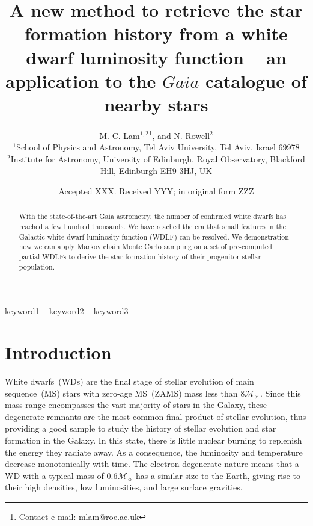 \documentclass[fleqn,usenatbib]{mnras}
\title[Galactic SFH from Gaia GCNS WDLF]{A new method to retrieve the star formation history from a white dwarf luminosity function -- an application to the $Gaia$ catalogue of nearby stars}
\author[M. C. Lam et al.]{
M. C. Lam$^{1, 2}$\thanks{Contact e-mail: \href{mailto:mlam@roe.ac.uk}{mlam@roe.ac.uk}},
and N. Rowell$^{2}$
\\
$^{1}$School of Physics and Astronomy, Tel Aviv University, Tel Aviv, Israel 69978\\
$^{2}$Institute for Astronomy, University of Edinburgh, Royal Observatory, Blackford Hill, Edinburgh EH9 3HJ, UK
}
\date{Accepted XXX. Received YYY; in original form ZZZ}
\newcommand{\msun}{\mathcal{M}_{\sun}}
\begin{document}
\label{firstpage}
\pagerange{\pageref{firstpage}--\pageref{lastpage}}
\maketitle


\begin{abstract}
With the state-of-the-art Gaia astrometry, the number of confirmed white dwarfs
has reached a few hundred thousands. We have reached the era that small features
in the Galactic white dwarf luminosity function (WDLF) can be resolved. We
demonstration how we can apply Markov chain Monte Carlo sampling on a set of
pre-computed partial-WDLFs to derive the star formation history of their progenitor
stellar population.

\end{abstract}

\begin{keywords}
keyword1 -- keyword2 -- keyword3
\end{keywords}



\section{Introduction}
White dwarfs~(WDs) are the final stage of stellar evolution of main
sequence~(MS) stars with zero-age MS~(ZAMS) mass less than $8\msun$. Since this
mass range encompasses the vast majority of stars in the Galaxy, these
degenerate remnants are the most common final product of stellar evolution,
thus providing a good sample to study the history of stellar evolution and star
formation in the Galaxy. In this state, there is little nuclear burning to
replenish the energy they radiate away. As a consequence, the luminosity and
temperature decrease monotonically with time. The electron degenerate nature
means that a WD with a typical mass of $0.6\mathcal{M}_{\sun}$ has a similar
size to the Earth, giving rise to their high densities, low luminosities, and
large surface gravities.
\end{document}

